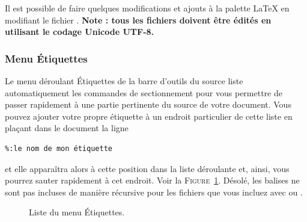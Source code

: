 \documentclass[11pt,french]{article}
\newcommand{\mnu}[1]{\textsf{#1}}
\begin{document}
Il est possible de faire quelques modifications et ajouts à la palette LaTeX  en modifiant le fichier . \textbf{Note : tous les fichiers  doivent être édités en utilisant le codage Unicode UTF-8.}


\subsubsection{Menu Étiquettes}

Le menu déroulant \mnu{Étiquettes} de la barre d'outils du source liste automatiquement les commandes de sectionnement pour vous permettre de passer rapidement à une partie pertinente du source de votre document. Vous pouvez ajouter votre propre étiquette à un endroit particulier de cette liste en plaçant dans le document la ligne
\begin{verbatim}
%:le nom de mon étiquette
\end{verbatim}
et elle apparaîtra alors à cette position dans la liste déroulante et, ainsi, vous pourrez sauter rapidement à cet endroit. Voir la \textsc{Figure}~\ref{fig:Tags}. Désolé, les balises ne sont pas incluses de manière récursive pour les fichiers que vous incluez avec \verb|| ou \verb||.

\begin{figure}
\centering
{}
\caption{Liste du menu Étiquettes.\label{fig:Tags}}
\end{figure}
\end{document}
